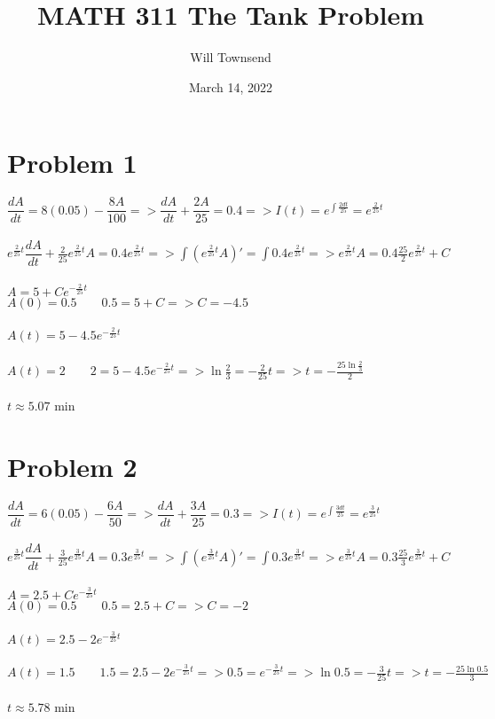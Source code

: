 \documentclass[12pt]{exam}
\title{\textbf{MATH 311 The Tank Problem}}
\author{Will Townsend}
\date{March 14, 2022}
\begin{document}
\maketitle

\section*{Problem 1}
$\dfrac{dA}{dt}=8(0.05)-\dfrac{8A}{100}=>\dfrac{dA}{dt}+\dfrac{2A}{25}=0.4=>I(t)=e^{\int\frac{2dt}{25}}=e^{\frac{2}{25}t}$\\\\
$e^{\frac{2}{25}t}\dfrac{dA}{dt}+\frac{2}{25}e^{\frac{2}{25}t}A=0.4e^{\frac{2}{25}t}=>\int(e^{\frac{2}{25}t}A)'=\int0.4e^{\frac{2}{25}t}=>e^{\frac{2}{25}t}A=0.4\frac{25}{2}e^{\frac{2}{25}t}+C$\\\\
$A=5+Ce^{-\frac{2}{25}t}$\\
$A(0)=0.5\qquad0.5=5+C=>C=-4.5$\\\\
$A(t)=5-4.5e^{-\frac{2}{25}t}$\\\\
$A(t)=2\qquad2=5-4.5e^{-\frac{2}{25}t}=>\ln{\frac{2}{3}}=-\frac{2}{25}t=>t=-\frac{25\ln{\frac{2}{3}}}{2}$\\\\
$t\approx5.07$ min
\section*{Problem 2}
$\dfrac{dA}{dt}=6(0.05)-\dfrac{6A}{50}=>\dfrac{dA}{dt}+\dfrac{3A}{25}=0.3=>I(t)=e^{\int\frac{3dt}{25}}=e^{\frac{3}{25}t}$\\\\
$e^{\frac{3}{25}t}\dfrac{dA}{dt}+\frac{3}{25}e^{\frac{3}{25}t}A=0.3e^{\frac{3}{25}t}=>\int(e^{\frac{3}{25}t}A)'=\int0.3e^{\frac{3}{25}t}=>e^{\frac{3}{25}t}A=0.3\frac{25}{3}e^{\frac{3}{25}t}+C$\\\\
$A=2.5+Ce^{-\frac{3}{25}t}$\\
$A(0)=0.5\qquad0.5=2.5+C=>C=-2$\\\\
$A(t)=2.5-2e^{-\frac{3}{25}t}$\\\\
$A(t)=1.5\qquad1.5=2.5-2e^{-\frac{3}{25}t}=>0.5=e^{-\frac{3}{25}t}=>\ln{0.5}=-\frac{3}{25}t=>t=-\frac{25\ln{0.5}}{3}$\\\\
$t\approx5.78$ min
\end{document}

